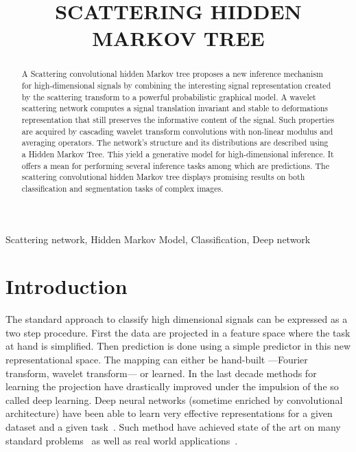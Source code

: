 \documentclass{article}
\title{SCATTERING HIDDEN MARKOV TREE}
\begin{document}
%
\maketitle
%
\begin{abstract}
	A Scattering convolutional hidden Markov tree proposes a new inference mechanism for high-dimensional signals by combining the interesting signal representation created by the scattering transform to a powerful probabilistic graphical model.
	A wavelet scattering network computes a signal translation invariant and stable to deformations representation that still preserves the informative content of the signal. Such properties are acquired by cascading wavelet transform convolutions with non-linear modulus and averaging operators.
	The network's structure and its distributions are described using a Hidden Markov Tree. This yield a generative model for high-dimensional inference. It offers a mean for performing several inference tasks among which are predictions. The scattering convolutional hidden Markov tree displays promising results on both classification and segmentation tasks of complex images.
\end{abstract}
%
\begin{keywords}
	Scattering network, Hidden Markov Model, Classification, Deep network
\end{keywords}
%
\section{Introduction}
\label{sec:Intro}

  The standard approach to classify high dimensional signals can be expressed as a two step procedure. First the data are projected in a feature space where the task at hand is simplified. Then prediction is done using a simple predictor in this new representational space. The mapping can either be hand-built ---\eg Fourier transform, wavelet transform--- or learned. In the last decade methods for learning the projection have drastically improved under the impulsion of the so called deep learning. Deep neural networks (sometime enriched by convolutional architecture) have been able to learn very effective representations for a given dataset and a given task~\citep{DNN, CNN}. Such method have achieved state of the art on many standard problems~\citep{alexNet} as well as real world applications~\citep{microsoft cortana}. 
  
  
\end{document}
